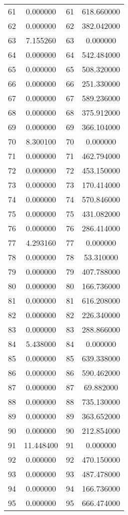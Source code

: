 \documentclass[12pt]{article}
\begin{document}
\begin{longtable}{@{}cccc@{}}
61 & 0.000000 & 61 & 618.660000 \\
62 & 0.000000 & 62 & 382.042000 \\
63 & 7.155260 & 63 & 0.000000 \\
64 & 0.000000 & 64 & 542.484000 \\
65 & 0.000000 & 65 & 508.320000 \\
66 & 0.000000 & 66 & 251.330000 \\
67 & 0.000000 & 67 & 589.236000 \\
68 & 0.000000 & 68 & 375.912000 \\
69 & 0.000000 & 69 & 366.104000 \\
70 & 8.300100 & 70 & 0.000000 \\
71 & 0.000000 & 71 & 462.794000 \\
72 & 0.000000 & 72 & 453.150000 \\
73 & 0.000000 & 73 & 170.414000 \\
74 & 0.000000 & 74 & 570.846000 \\
75 & 0.000000 & 75 & 431.082000 \\
76 & 0.000000 & 76 & 286.414000 \\
77 & 4.293160 & 77 & 0.000000 \\
78 & 0.000000 & 78 & 53.310000 \\
79 & 0.000000 & 79 & 407.788000 \\
80 & 0.000000 & 80 & 166.736000 \\
81 & 0.000000 & 81 & 616.208000 \\
82 & 0.000000 & 82 & 226.340000 \\
83 & 0.000000 & 83 & 288.866000 \\
84 & 5.438000 & 84 & 0.000000 \\
85 & 0.000000 & 85 & 639.338000 \\
86 & 0.000000 & 86 & 590.462000 \\
87 & 0.000000 & 87 & 69.882000 \\
88 & 0.000000 & 88 & 735.130000 \\
89 & 0.000000 & 89 & 363.652000 \\
90 & 0.000000 & 90 & 212.854000 \\
91 & 11.448400 & 91 & 0.000000 \\
92 & 0.000000 & 92 & 470.150000 \\
93 & 0.000000 & 93 & 487.478000 \\
94 & 0.000000 & 94 & 166.736000 \\
95 & 0.000000 & 95 & 666.474000 \\

\end{longtable}
\end{document}

